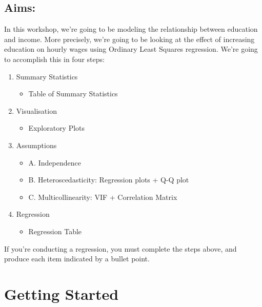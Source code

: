 \documentclass[
  letterpaper,
  DIV=11,
  numbers=noendperiod]{scrreprt}
\providecommand{\tightlist}{%
  \setlength{\itemsep}{0pt}\setlength{\parskip}{0pt}}\usepackage{longtable,booktabs,array}
\begin{document}
\hypertarget{aims-5}{%
\subsection{Aims:}\label{aims-5}}

In this workshop, we're going to be modeling the relationship between
education and income. More precisely, we're going to be looking at the
effect of increasing education on hourly wages using Ordinary Least
Squares regression. We're going to accomplish this in four steps:

\begin{enumerate}
\def\labelenumi{\arabic{enumi}.}
\tightlist
\item
  Summary Statistics

  \begin{itemize}
  \tightlist
  \item
    Table of Summary Statistics
  \end{itemize}
\item
  Visualisation

  \begin{itemize}
  \tightlist
  \item
    Exploratory Plots
  \end{itemize}
\item
  Assumptions

  \begin{itemize}
  \tightlist
  \item
    A. Independence
  \item
    B. Heteroscedasticity: Regression plots + Q-Q plot
  \item
    C. Multicollinearity: VIF + Correlation Matrix
  \end{itemize}
\item
  Regression

  \begin{itemize}
  \tightlist
  \item
    Regression Table
  \end{itemize}
\end{enumerate}

If you're conducting a regression, you must complete the steps above,
and produce each item indicated by a bullet point.

\hypertarget{getting-started-3}{%
\section{Getting Started}\label{getting-started-3}}
\end{document}
